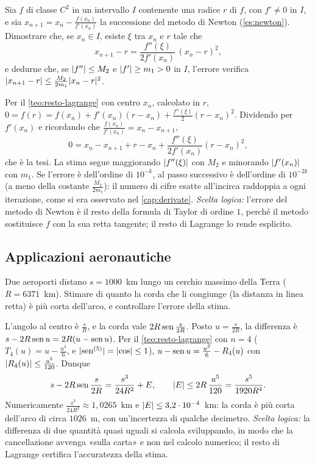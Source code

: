 \begin{esercizio}\label{es:newton-quadratico}
Sia $f$ di classe $C^{2}$ in un intervallo $I$ contenente una radice $r$ di $f$, con $f'\neq0$
in $I$, e sia $x_{n+1}=x_{n}-\frac{f(x_{n})}{f'(x_{n})}$ la successione del metodo di Newton
(\cref{es:newton}). Dimostrare che, se $x_{n}\in I$, esiste $\xi$ tra $x_{n}$ e $r$ tale che
\[
  x_{n+1}-r=\frac{f''(\xi)}{2f'(x_{n})}\,(x_{n}-r)^{2} ,
\]
e dedurne che, se $\lvert f''\rvert\le M_{2}$ e $\lvert f'\rvert\ge m_{1}>0$ in $I$, l'errore verifica
$\lvert x_{n+1}-r\rvert\le\frac{M_{2}}{2m_{1}}\lvert x_{n}-r\rvert^{2}$.
\begin{soluzione}
Per il \cref{teo:resto-lagrange} con centro $x_{n}$, calcolato in $r$,
$0=f(r)=f(x_{n})+f'(x_{n})(r-x_{n})+\frac{f''(\xi)}2(r-x_{n})^{2}$. Dividendo per $f'(x_{n})$ e
ricordando che $\frac{f(x_{n})}{f'(x_{n})}=x_{n}-x_{n+1}$,
\[
  0=x_{n}-x_{n+1}+r-x_{n}+\frac{f''(\xi)}{2f'(x_{n})}(r-x_{n})^{2} ,
\]
che è la tesi. La stima segue maggiorando $\lvert f''(\xi)\rvert$ con $M_{2}$ e minorando $\lvert f'(x_{n})\rvert$
con $m_{1}$. Se l'errore è dell'ordine di $10^{-k}$, al passo successivo è dell'ordine di
$10^{-2k}$ (a meno della costante $\frac{M_{2}}{2m_{1}}$): il numero di cifre esatte all'incirca
raddoppia a ogni iterazione, come si era osservato nel \cref{cap:derivate}. \emph{Scelta
logica:} l'errore del metodo di Newton è il resto della formula di Taylor di ordine $1$,
perché il metodo sostituisce $f$ con la sua retta tangente; il resto di Lagrange lo
rende esplicito.
\end{soluzione}
\end{esercizio}

\subsection*{Applicazioni aeronautiche}

\begin{esercizio}
Due aeroporti distano $s=1000$~km lungo un cerchio massimo della Terra ($R=6371$~km).
Stimare di quanto la corda che li congiunge (la distanza in linea retta) è più corta
dell'arco, e controllare l'errore della stima.
\begin{soluzione}
L'angolo al centro è $\frac sR$, e la corda vale $2R\operatorname{sen}\frac s{2R}$. Posto $u=\frac s{2R}$, la
differenza è $s-2R\operatorname{sen} u=2R(u-\operatorname{sen} u)$. Per il \cref{teo:resto-lagrange} con $n=4$
($T_{4}(u)=u-\frac{u^{3}}6$, e $\lvert \operatorname{sen}^{(5)}\rvert=\lvert \cos\rvert\le1$),
$u-\operatorname{sen} u=\frac{u^{3}}6-R_{4}(u)$ con $\lvert R_{4}(u)\rvert\le\frac{u^{5}}{120}$. Dunque
\[
  s-2R\operatorname{sen}\frac s{2R}=\frac{s^{3}}{24R^{2}}+E, \qquad
  \lvert E\rvert\le2R\,\frac{u^{5}}{120}=\frac{s^{5}}{1920R^{4}} .
\]
Numericamente $\frac{s^{3}}{24R^{2}}\approx1{,}0265$~km e $\lvert E\rvert\le3{,}2\cdot10^{-4}$~km: la corda è più corta
dell'arco di circa $1026$~m, con un'incertezza di qualche decimetro.
\emph{Scelta logica:} la differenza di due quantità quasi uguali si calcola sviluppando,
in modo che la cancellazione avvenga «sulla carta» e non nel calcolo numerico; il resto
di Lagrange certifica l'accuratezza della stima.
\end{soluzione}
\end{esercizio}

